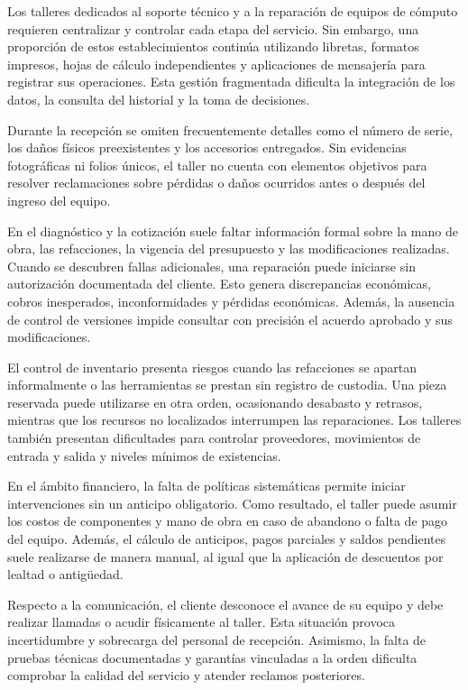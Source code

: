 Los talleres dedicados al soporte técnico y a la reparación de equipos de cómputo requieren centralizar y controlar cada etapa del servicio. Sin embargo, una proporción de estos establecimientos continúa utilizando libretas, formatos impresos, hojas de cálculo independientes y aplicaciones de mensajería para registrar sus operaciones. Esta gestión fragmentada dificulta la integración de los datos, la consulta del historial y la toma de decisiones.

Durante la recepción se omiten frecuentemente detalles como el número de serie, los daños físicos preexistentes y los accesorios entregados. Sin evidencias fotográficas ni folios únicos, el taller no cuenta con elementos objetivos para resolver reclamaciones sobre pérdidas o daños ocurridos antes o después del ingreso del equipo.

En el diagnóstico y la cotización suele faltar información formal sobre la mano de obra, las refacciones, la vigencia del presupuesto y las modificaciones realizadas. Cuando se descubren fallas adicionales, una reparación puede iniciarse sin autorización documentada del cliente. Esto genera discrepancias económicas, cobros inesperados, inconformidades y pérdidas económicas. Además, la ausencia de control de versiones impide consultar con precisión el acuerdo aprobado y sus modificaciones.

El control de inventario presenta riesgos cuando las refacciones se apartan informalmente o las herramientas se prestan sin registro de custodia. Una pieza reservada puede utilizarse en otra orden, ocasionando desabasto y retrasos, mientras que los recursos no localizados interrumpen las reparaciones. Los talleres también presentan dificultades para controlar proveedores, movimientos de entrada y salida y niveles mínimos de existencias.

En el ámbito financiero, la falta de políticas sistemáticas permite iniciar intervenciones sin un anticipo obligatorio. Como resultado, el taller puede asumir los costos de componentes y mano de obra en caso de abandono o falta de pago del equipo. Además, el cálculo de anticipos, pagos parciales y saldos pendientes suele realizarse de manera manual, al igual que la aplicación de descuentos por lealtad o antigüedad.

Respecto a la comunicación, el cliente desconoce el avance de su equipo y debe realizar llamadas o acudir físicamente al taller. Esta situación provoca incertidumbre y sobrecarga del personal de recepción. Asimismo, la falta de pruebas técnicas documentadas y garantías vinculadas a la orden dificulta comprobar la calidad del servicio y atender reclamos posteriores.

